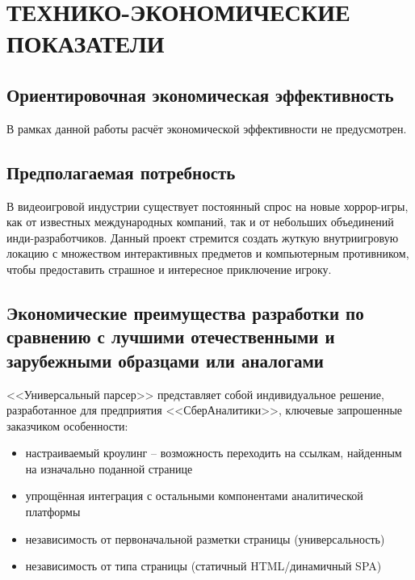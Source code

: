 \section{ТЕХНИКО-ЭКОНОМИЧЕСКИЕ ПОКАЗАТЕЛИ}

\subsection{Ориентировочная экономическая эффективность}

В рамках данной работы расчёт экономической эффективности не предусмотрен.

\subsection{Предполагаемая потребность}

В видеоигровой индустрии существует постоянный спрос на новые хоррор-игры, как от известных международных компаний, так и от небольших объединений инди-разработчиков. Данный проект стремится создать жуткую внутриигровую локацию с множеством интерактивных предметов и компьютерным противником, чтобы предоставить страшное и интересное приключение игроку.

\subsection{Экономические преимущества разработки по сравнению с лучшими отечественными и зарубежными образцами или аналогами}

<<Универсальный парсер>> представляет собой индивидуальное решение, разработанное для предприятия <<СберАналитики>>, ключевые запрошенные заказчиком особенности:

\begin{itemize}
    \item настраиваемый кроулинг -- возможность переходить на ссылкам, найденным на изначально поданной странице
    \item упрощённая интеграция с остальными компонентами аналитической платформы
    \item независимость от первоначальной разметки страницы (универсальность)
    \item независимость от типа страницы (статичный HTML/динамичный SPA)
\end{itemize}